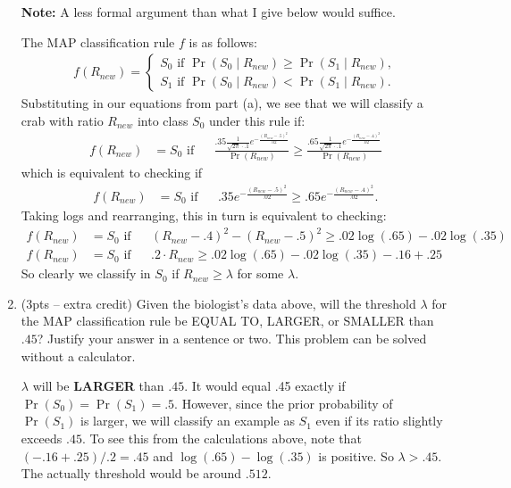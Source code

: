 \documentclass[10pt]{article}
\begin{document}
\begin{enumerate}[label=(\alph*)]
	\color{blue}
	\textbf{Note:} A less formal argument than what I give below would suffice.
	
	
	The MAP classification rule $f$ is as follows:	
	\begin{align*}
	f(R_{new}) = \begin{cases}
	S_0 \text{ if } \Pr(S_0 \mid R_{new}) \geq \Pr(S_1 \mid R_{new}), \\
	S_1 \text{ if } \Pr(S_0 \mid R_{new}) < \Pr(S_1 \mid R_{new}).
	\end{cases}
	\end{align*}
	Substituting in our equations from part (a), we see that we will classify a crab with ratio $R_{new}$ into class $S_0$ under this rule if:
	\begin{align*}
	f(R_{new}) &= S_0 \text{ if} & &\frac{.35\frac{1}{\sqrt{2\pi}\cdot .1}e^{-\frac{(R_{new} - .5)^2}{.02}}}{\Pr(R_{new})} \geq \frac{.65\frac{1}{\sqrt{2\pi}\cdot .1}e^{-\frac{(R_{new} - .4)^2}{.02}}}{\Pr(R_{new})}
	\end{align*}
	which is equivalent to checking if
	\begin{align*}
	\label{eq:check}
	f(R_{new}) &= S_0 \text{ if} & &.35 e^{-\frac{(R_{new} - .5)^2}{.02}} \geq .65e^{-\frac{(R_{new} - .4)^2}{.02}}. 
	\end{align*}
	Taking logs and rearranging, this in turn is equivalent to checking:
	\begin{align*}
		f(R_{new}) &= S_0 \text{ if} & & (R_{new} - .4)^2 - (R_{new} - .5)^2 \geq .02\log(.65) - .02\log(.35) \\
		f(R_{new}) &= S_0 \text{ if} & &.2\cdot R_{new} \geq .02\log(.65) - .02\log(.35) - .16 + .25
	\end{align*}
	So clearly we classify in $S_0$ if $R_{new} \geq \lambda$ for some $\lambda$.
	
	\color{black}
		
	\item (3pts -- extra credit) Given the biologist's data above, will the threshold $\lambda$ for the MAP classification rule be EQUAL TO, LARGER, or SMALLER than $.45$? Justify your answer in a sentence or two. This problem can be solved without a calculator. 
	
	\color{blue}
	$\lambda$ will be \textbf{LARGER} than $.45$. It would equal .45 exactly if $\Pr(S_0) = \Pr(S_1) = .5$. However, since the prior probability of $\Pr(S_1)$ is larger, we will classify an example as $S_1$ even if its ratio slightly exceeds $.45$. To see this from the calculations above, note that $(- .16 + .25)/.2 = .45$ and $\log(.65) - \log(.35)$ is positive. So $\lambda > .45$. The actually threshold would be around $.512$. 
	\color{black}
	
\end{enumerate}
\end{document}
